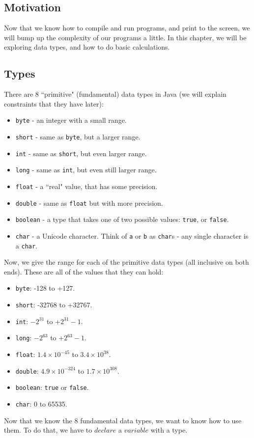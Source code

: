 
\subsection{Motivation}
Now that we know how to compile and run programs, and print to the screen, we will bump up the complexity of our programs a little. In this chapter, we will be exploring data types, and how to do basic calculations.

\subsection{Types}
There are 8 ``primitive" (fundamental) data types in Java (we will explain constraints that they have later):
\begin{itemize}
\item \texttt{byte} - an integer with a small range.
\item \texttt{short} - same as \texttt{byte}, but a larger range.
\item \verb|int| - same as \verb|short|, but even larger range.
\item \verb|long| - same as \verb|int|, but even still larger range.
\item \verb|float| - a ``real" value, that has some precision.
\item \verb|double| - same as \verb|float| but with more precision.
\item \verb|boolean| - a type that takes one of two possible values: \verb|true|, or \verb|false|.
\item \verb|char| - a Unicode character. Think of \verb|a| or \verb|b| as \verb|char|s - any single character is a \verb|char|.
\end{itemize}

\noindent Now, we give the range for each of the primitive data types (all inclusive on both ends). These are all of the values that they can hold:
\begin{itemize}
\item \verb|byte|: -128 to +127.
\item \verb|short|: -32768 to +32767.
\item \verb|int|: $-2^{31}$ to $+2^{31}-1$.
\item \verb|long|: $-2^{63}$ to $+2^{63}-1$.
\item \verb|float|: $1.4 \times 10^{-45}$ to $3.4 \times 10^{38}$.
\item \verb|double|: $4.9 \times 10^{-324}$ to $1.7 \times 10^{308}$.
\item \verb|boolean|: \verb|true| or \verb|false|.
\item \verb|char|: 0 to 65535.
\end{itemize}
Now that we know the 8 fundamental data types, we want to know how to use them. To do that, we have to $declare$ a $variable$ with a type.

